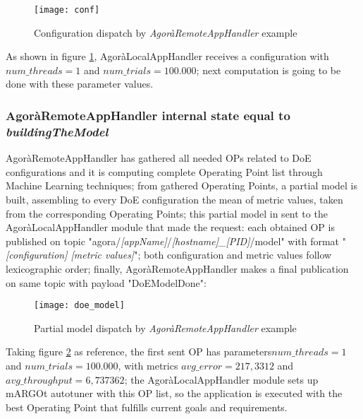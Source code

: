 \begin{figure}[H]

    \centering
    \texttt{[image: conf]}
    \caption{Configuration dispatch by \textit{AgoràRemoteAppHandler} example}
    \label{fig:conf}
    
\end{figure}

As shown in figure \ref{fig:conf}, AgoràLocalAppHandler receives a configuration with $num\_threads = 1$ and $num\_trials = 100.000$; next computation is going to be done with these parameter values.


\subsubsection{AgoràRemoteAppHandler internal state equal to \textit{building\-The\-Model}}\label{DoEModelSend}

AgoràRemoteAppHandler has gathered all needed OPs related to DoE configurations and it is computing complete Operating Point list through Machine Learning techniques; from gathered Operating Points, a partial model is built, assembling to every DoE configuration the mean of metric values, taken from the corresponding Operating Points; this partial model in sent to the Agorà\-Local\-App\-Handler module that made the request: each obtained OP is published on topic "agora\slash{}\textit{[appName]}\slash{}\textit{[hostname]\_[PID]}\slash{}mod\-el" with format "\textit{[configuration] [metric values]}"; both configuration and metric values follow lexicographic order; finally, AgoràRemoteAppHandler makes a final publication on same topic with payload "DoEModelDone":

\begin{figure}[H]

    \centering
    \texttt{[image: doe\_model]}
    \caption{Partial model dispatch by \textit{AgoràRemoteAppHandler} example}
    \label{fig:doe_model}
    
\end{figure}

Taking figure \ref{fig:doe_model} as reference, the first sent OP has parameters\linebreak $num\_threads = 1$ and $num\_trials = 100.000$, with metrics $avg\_error = 217,3312$ and $avg\_throughput = 6,737362$; the AgoràLocalAppHandler module sets up mARGOt autotuner with this OP list, so the application is executed with the best Operating Point that fulfills current goals and requirements.


